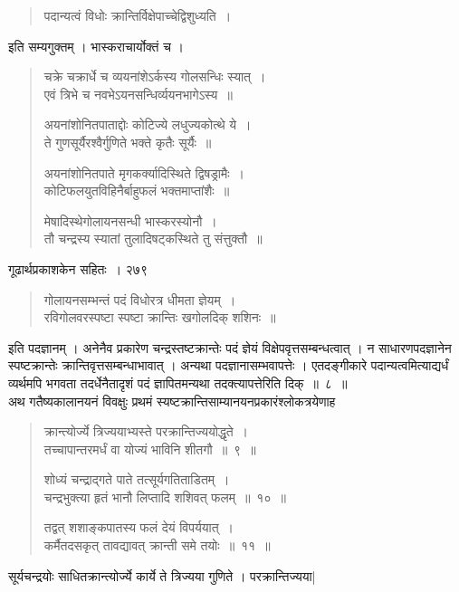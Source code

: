 \documentclass[11pt, openany]{book}
\begin{document}

\begin{quote}
{\qt पदान्यत्वं विधोः क्रान्तिर्विक्षेपाच्चेद्विशुध्यति~।}
\end{quote}
इति सम्यगुक्तम् । भास्कराचार्योक्तं च ।

\begin{quote}
{\qt चक्रे चक्रार्धे च व्ययनांशेऽर्कस्य गोलसन्धिः स्यात्~।\\
एवं त्रिभे च नवभेऽयनसन्धिर्व्ययनभागेऽस्य~॥

अयनांशोनितपाताद्दोः कोटिज्ये लधुज्यकोत्थे ये~।\\
ते गुणसूर्यैरश्वैर्गुणिते भक्ते कृतैः सूर्यैः~॥

अयनांशोनितपाते मृगकर्क्यादिस्थिते द्विषड्रामैः~।\\
कोटिफलयुतविहिनैर्बाहुफलं भक्तमाप्तांशैः~॥

मेषादिस्थेगोलायनसन्धी भास्करस्योनौ~।\\
तौ चन्द्रस्य स्यातां तुलादिषट्कस्थिते तु संत्तुक्तौ~॥}
\end{quote}


\newpage


\hspace{3cm} गूढार्थप्रकाशकेन सहितः~। \hfill २७९
\vspace{1cm}

%

\begin{quote}
{\qt गोलायनसम्भन्तं पदं विधोरत्र धीमता ज्ञेयम्~।\\
 रविगोलवरस्पष्टा स्पष्टा क्रान्तिः खगोलदिक् शशिनः~॥}
\end{quote}
इति पदज्ञानम् । अनेनैव प्रकारेण चन्द्रस्तष्टक्रान्तेः पदं ज्ञेयं विक्षेपवृत्तसम्बन्धत्वात् । न साधारणपदज्ञानेन स्पष्टक्रान्तेः क्रान्तिवृत्तसम्बन्धाभावात् । अन्यथा पदज्ञानासम्भवापत्तेः । एतदङ्गीकारे पदान्यत्वमित्याद्यर्धं व्यर्थमपि भगवता तदर्धेनैतादृशं पदं ज्ञापितमन्यथा तदक्त्यापत्तेरिति दिक्~॥~८~॥\\
\noindent अथ गतैष्यकालानयनं विवक्षुः प्रथमं स्यष्टक्रान्तिसाम्यानयनप्रकारंश्लोकत्रयेणाह \textendash

\begin{quote}
{\ssi क्रान्त्योर्ज्ये त्रिज्ययाभ्यस्ते परक्रान्तिज्ययोद्धृते~।\\
 तच्चापान्तरमर्धं वा योज्यं भाविनि शीतगौ~॥~९~॥

शोध्यं चन्द्राद्गते पाते तत्सूर्यगतिताडितम्~।\\
चन्द्रभुक्त्या हृतं भानौ लिप्तादि शशिवत् फलम्~॥~१०~॥

तद्वत् शशाङ्कपातस्य फलं देयं विपर्ययात्~।\\
कर्मैतदसकृत् तावद्यावत् क्रान्ती समे तयोः~॥~११~॥ }
\end{quote}
 सूर्यचन्द्रयोः साधितक्रान्त्योर्ज्ये कार्ये ते त्रिज्यया गुणिते । परक्रान्तिज्यया| 
\end{document}
